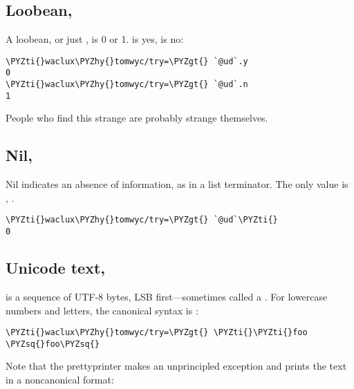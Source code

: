 \subsection{Loobean, }

A loobean, or just , is 0 or 1.   is yes,  is no:

\begin{framed_shaded}
\begin{Verbatim}[fontsize=\relsize{-2.5},fontseries=b,commandchars=\\\{\}]
\PYZti{}waclux\PYZhy{}tomwyc/try=\PYZgt{} `@ud`.y
0
\PYZti{}waclux\PYZhy{}tomwyc/try=\PYZgt{} `@ud`.n
1
\end{Verbatim}
\end{framed_shaded}
People who find this strange are probably strange themselves.

\subsection{Nil, }

Nil indicates an absence of information, as in a list terminator.
The only value is \kode{\sig }, .

\begin{framed_shaded}
\begin{Verbatim}[fontsize=\relsize{-2.5},fontseries=b,commandchars=\\\{\}]
\PYZti{}waclux\PYZhy{}tomwyc/try=\PYZgt{} `@ud`\PYZti{}
0
\end{Verbatim}
\end{framed_shaded}

\subsection{Unicode text, }

 is a sequence of UTF-8 bytes, LSB first---sometimes called a
.  For lowercase numbers and letters, the canonical syntax 
is :

\begin{framed_shaded}
\begin{Verbatim}[fontsize=\relsize{-2.5},fontseries=b,commandchars=\\\{\}]
\PYZti{}waclux\PYZhy{}tomwyc/try=\PYZgt{} \PYZti{}\PYZti{}foo
\PYZsq{}foo\PYZsq{}
\end{Verbatim}
\end{framed_shaded}
Note that the prettyprinter makes an unprincipled exception and 
prints the text in a noncanonical format:

